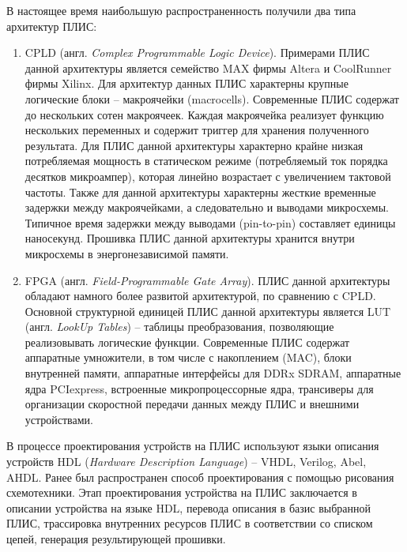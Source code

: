 В настоящее время наибольшую распространенность получили два типа архитектур
ПЛИС:
\begin{enumerate}
    \item CPLD (англ. \emph{Complex Programmable Logic Device}). Примерами ПЛИС
    данной архитектуры является семейство MAX фирмы Altera и CoolRunner фирмы
    Xilinx. Для архитектур данных ПЛИС характерны крупные логические блоки --
    макроячейки (macrocells). Современные ПЛИС содержат до нескольких сотен
    макроячеек. Каждая макроячейка реализует функцию нескольких переменных и
    содержит триггер для хранения полученного результата. Для ПЛИС данной
    архитектуры характерно крайне низкая потребляемая мощность в статическом
    режиме (потребляемый ток порядка десятков микроампер), которая линейно
    возрастает с увеличением тактовой частоты. Также для данной архитектуры
    характерны жесткие временные задержки между макроячейками, а следовательно
    и выводами микросхемы. Типичное время задержки между выводами (pin-to-pin)
    составляет единицы наносекунд. Прошивка ПЛИС данной архитектуры хранится
    внутри микросхемы в энергонезависимой памяти.
    
    \item FPGA (англ. \emph{Field-Programmable Gate Array}). ПЛИС данной
    архитектуры обладают намного более развитой архитектурой, по сравнению с
    CPLD. Основной структурной единицей ПЛИС данной архитектуры является LUT
    (англ. \emph{LookUp Tables}) -- таблицы преобразования, позволяющие
    реализовывать логические функции. Современные ПЛИС содержат аппаратные
    умножители, в том числе с накоплением (MAC), блоки внутренней памяти,
    аппаратные интерфейсы для DDRx SDRAM, аппаратные ядра PCIexpress,
    встроенные микропроцессорные ядра, трансиверы для организации скоростной
    передачи данных между ПЛИС и внешними устройствами.
\end{enumerate}

В процессе проектирования устройств на ПЛИС используют языки описания устройств
HDL (\emph{Hardware Description Language}) -- VHDL, Verilog, Abel, AHDL. Ранее
был распространен способ проектирования с помощью рисования схемотехники. Этап
проектирования устройства на ПЛИС заключается в описании устройства на языке
HDL, перевода описания в базис выбранной ПЛИС, трассировка внутренних ресурсов
ПЛИС в соответствии со списком цепей, генерация результирующей прошивки.

\vspace*{2em} %

